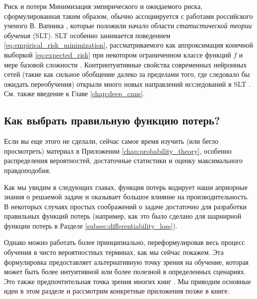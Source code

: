 \begin{supportbox}{Риск и потери}
Минимизация эмпирического и ожидаемого риска, сформулированная таким образом, обычно ассоциируется с работами российского ученого В. Вапника \cite{vapnik2013nature}, которые положили начало области \textit{статистической теории обучения} (SLT). SLT особенно занимается поведением \eqref{eq:empirical_risk_minimization}, рассматриваемого как аппроксимация конечной выборкой \eqref{eq:expected_risk} при некотором ограниченном классе функций $f$ и мере базовой сложности \cite{poggio2003mathematics,shalev2014understanding,mohri2018foundations}. Контринтуитивные свойства современных нейронных сетей (такие как сильное обобщение далеко за пределами того, где следовало бы ожидать переобучения) открыли много новых направлений исследований в SLT \cite{poggio2020theoretical}. См. также введение к Главе \ref{chap:deep_cnns}.
\end{supportbox}

\subsection{Как выбрать правильную функцию потерь?} 
\label{subsec:how_to_select_a_loss}

\begin{tcolorbox}
Если вы еще этого не сделали, сейчас самое время изучить (или бегло просмотреть) материал в Приложении \ref{chap:probability_theory}, особенно распределения вероятностей, достаточные статистики и оценку максимального правдоподобия.
\end{tcolorbox}

Как мы увидим в следующих главах, функция потерь кодирует наши априорные знания о решаемой задаче и оказывает большое влияние на производительность. В некоторых случаях простых соображений о задаче достаточно для разработки правильных функций потерь (например, как это было сделано для шарнирной функции потерь в Разделе \ref{subsec:differentiability_loss}).

Однако можно работать более принципиально, переформулировав весь процесс обучения в чисто вероятностных терминах, как мы сейчас покажем. Эта формулировка предоставляет альтернативную точку зрения на обучение, которая может быть более интуитивной или более полезной в определенных сценариях. Это также предпочтительная точка зрения многих книг \cite{bishop2024deep}. Мы приводим основные идеи в этом разделе и рассмотрим конкретные приложения позже в книге.

